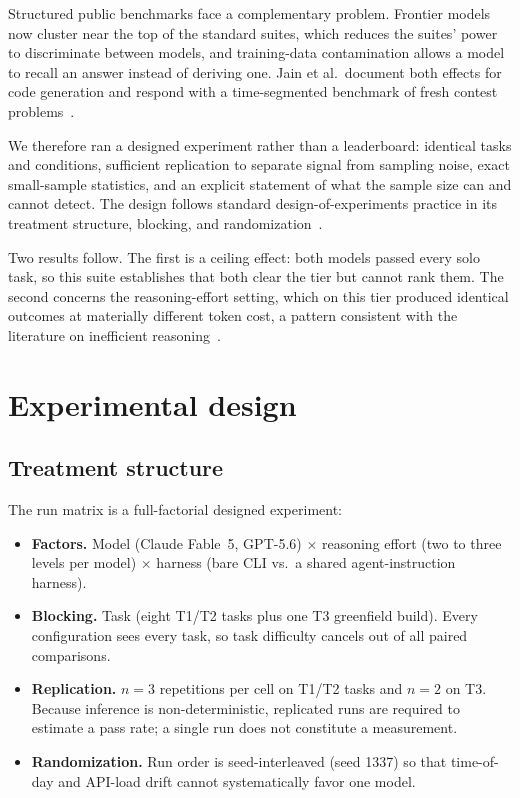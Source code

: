 \documentclass[11pt]{article}
\newcommand{\fable}{Claude Fable~5}
\newcommand{\sol}{GPT-5.6}
\begin{document}
Structured public benchmarks face a complementary problem. Frontier models
now cluster near the top of the standard suites, which reduces the suites'
power to discriminate between models, and training-data contamination
allows a model to recall an answer instead of deriving one. Jain et al.\
document both effects for code generation and respond with a
time-segmented benchmark of fresh contest problems~\cite{jain2024livecodebench}.

We therefore ran a designed experiment rather than a leaderboard: identical
tasks and conditions, sufficient replication to separate signal from
sampling noise, exact small-sample statistics, and an explicit statement of
what the sample size can and cannot detect. The design follows standard
design-of-experiments practice in its treatment structure, blocking, and
randomization~\cite{montgomery2017doe}.

Two results follow. The first is a ceiling effect: both models passed every
solo task, so this suite establishes that both clear the tier but cannot
rank them. The second concerns the reasoning-effort setting, which on this
tier produced identical outcomes at materially different token cost, a
pattern consistent with the literature on inefficient
reasoning~\cite{sui2025overthinking,su2025underthinking}.

\section{Experimental design}

\subsection{Treatment structure}

The run matrix is a full-factorial designed experiment:

\begin{itemize}
  \item \textbf{Factors.} Model (\fable{}, \sol{}) $\times$ reasoning effort
        (two to three levels per model) $\times$ harness (bare CLI vs.\ a
        shared agent-instruction harness).
  \item \textbf{Blocking.} Task (eight T1/T2 tasks plus one T3 greenfield
        build). Every configuration sees every task, so task difficulty
        cancels out of all paired comparisons.
  \item \textbf{Replication.} $n=3$ repetitions per cell on T1/T2 tasks and
        $n=2$ on T3. Because inference is non-deterministic, replicated
        runs are required to estimate a pass rate; a single run does not
        constitute a measurement.
  \item \textbf{Randomization.} Run order is seed-interleaved (seed 1337) so
        that time-of-day and API-load drift cannot systematically favor one
        model.
\end{itemize}
\end{document}
